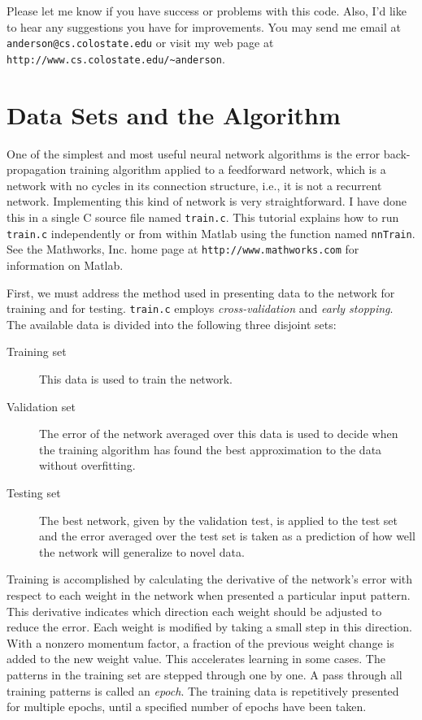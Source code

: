 Please let me know if you have success or problems with this code.  Also, I'd
like to hear any suggestions you have for improvements.  You may send me email
at \verb'anderson@cs.colostate.edu' or visit my web page at
\verb'http://www.cs.colostate.edu/~anderson'.

\section{Data Sets and the Algorithm}

One of the simplest and most useful neural network algorithms is the
error back-propagation training algorithm applied to a feedforward
network, which is a network with no cycles in its connection
structure, i.e., it is not a  recurrent network.  Implementing this
kind of network is very straightforward.  I have done this in a single
C source file named \verb'train.c'.  This tutorial explains how to
run \verb'train.c' independently or from within Matlab using the function
named \verb'nnTrain'. See the Mathworks, Inc. home page at
\verb'http://www.mathworks.com' for information on Matlab.

First, we must address the method used in presenting data to the
network for training and for testing.  \verb'train.c' employs 
{\em cross-validation} and {\em early stopping}.  The available data is
divided into 
the following three disjoint sets:
\begin{description}
\item[Training set] This data is used to train the network.  
\item[Validation set] The error of the network averaged over this data
is used to decide when the training algorithm has found the best
approximation to the data without overfitting.
\item[Testing set] The best network, given by the validation test, is
applied to the test set and the error averaged over the test set is
taken as a prediction of how well the network will generalize to novel
data.
\end{description}

Training is accomplished by calculating the derivative of the network's error
with respect to each weight in the network when presented a particular input
pattern.  This derivative indicates which direction each weight should be
adjusted to reduce the error.  Each weight is modified by taking a small step
in this direction.  With a nonzero momentum factor, a fraction of the previous
weight change is added to the new weight value.  This  accelerates learning
in some cases.  The patterns in the training set are stepped through one by
one.  A pass through all training patterns is called an {\em epoch}.  The
training data is repetitively presented for multiple epochs, until a specified
number of epochs have been taken.

